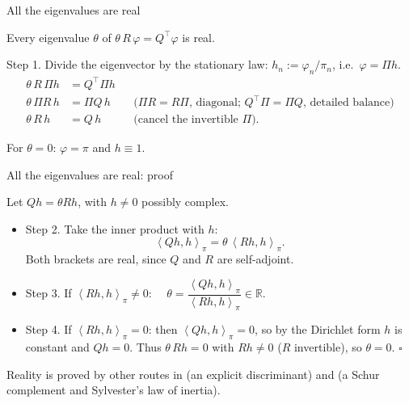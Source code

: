 \documentclass[aspectratio=169]{beamer}
\renewcommand{\cite}{\citep}
\newcommand{\R}{\mathbb{R}}
\newcommand{\brackets}[2]{\left\langle#1,#2\right\rangle}
\renewcommand{\phi}{\varphi}
\newenvironment*{myitem}[1][1.5em]{\begin{itemize}\setlength{\itemsep}{#1}}{\end{itemize}}
\begin{document}
\begin{frame}{All the eigenvalues are real}

	\begin{theorem}
		Every eigenvalue $\theta$ of $\theta\,R\,\phi = Q^\top\phi$ is real.
	\end{theorem}

	\medskip

	\alert{Step 1.} Divide the eigenvector by the stationary law: $h_n := \phi_n/\pi_n$, i.e.\ $\phi = \Pi h$.
	\begin{align*}
		\theta\,R\,\Pi h &= Q^\top \Pi h\\
		\theta\,\Pi R\, h &= \Pi Q\, h && \text{($\Pi R=R\Pi$, diagonal; $Q^\top\Pi = \Pi Q$, detailed balance)}\\
		\theta\,R\,h &= Q\,h && \text{(cancel the invertible $\Pi$).}
	\end{align*}

	\vfill
	
	{\footnotesize For $\theta=0$: $\phi=\pi$ and $h\equiv 1$.}
	
\end{frame}

\begin{frame}{All the eigenvalues are real: proof}

	Let $Qh=\theta Rh$, with $h\neq 0$ possibly complex.

	\medskip

	\begin{myitem}
		\item \alert{Step 2.} Take the inner product with $h$:
		\begin{equation*}
			\brackets{Qh}{h}_\pi = \theta\,\brackets{Rh}{h}_\pi .
		\end{equation*}
		Both brackets are \alert{real}, since $Q$ and $R$ are self-adjoint.
		\item \alert{Step 3.} If $\brackets{Rh}{h}_\pi\neq 0$: $\quad\theta = \dfrac{\brackets{Qh}{h}_\pi}{\brackets{Rh}{h}_\pi}\in\R$.
		\item \alert{Step 4.} If $\brackets{Rh}{h}_\pi= 0$: then $\brackets{Qh}{h}_\pi=0$, so by the Dirichlet form $h$ is constant and $Qh=0$. Thus $\theta\,Rh=0$ with $Rh\neq0$ ($R$ invertible), so $\theta=0$. \hfill $\square$
	\end{myitem}

	\vfill
	{\footnotesize Reality is proved by other routes in \cite{AMS1982} (an explicit discriminant) and \cite{Mitra1988} (a Schur complement and Sylvester's law of inertia).}
\end{frame}
\end{document}
